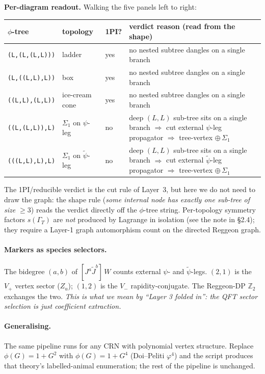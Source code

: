 \documentclass[11pt,a4paper]{article}
\begin{document}
\noindent\textbf{Per-diagram readout.} Walking the five panels left to right:
\begin{center}
\small
\begin{tabular}{@{}lllp{7cm}@{}}
\toprule
$\phi$-tree & topology & 1PI? & verdict reason (read from the shape) \\
\midrule
\texttt{(L,(L,(L,L)))} & ladder         & yes & no nested subtree dangles on a single branch \\
\texttt{(L,((L,L),L))} & box            & yes & no nested subtree dangles on a single branch \\
\texttt{((L,L),(L,L))} & ice-cream cone & yes & no nested subtree dangles on a single branch \\
\texttt{((L,(L,L)),L)} & $\Sigma_1$ on $\psi$-leg       & no  & deep $(L,L)$ sub-tree sits on a single branch $\Rightarrow$ cut external $\psi$-leg propagator $\Rightarrow$ tree-vertex $\oplus\,\Sigma_1$ \\
\texttt{(((L,L),L),L)} & $\Sigma_1$ on $\tilde\psi$-leg & no  & deep $(L,L)$ sub-tree sits on a single branch $\Rightarrow$ cut external $\tilde\psi$-leg propagator $\Rightarrow$ tree-vertex $\oplus\,\Sigma_1$ \\
\bottomrule
\end{tabular}
\end{center}
\noindent The 1PI/reducible verdict is the cut rule of Layer~3, but here we
do not need to draw the graph: the shape rule (\emph{some internal node has
exactly one sub-tree of size $\ge 3$}) reads the verdict directly off the
$\phi$-tree string. Per-topology symmetry factors $s(\Gamma_T)$ are
\emph{not} produced by Lagrange in isolation (see the note in \S2.4); they
require a Layer-1 graph automorphism count on the directed Reggeon graph.

\paragraph{Markers as species selectors.} The bidegree $(a,b)$ of
$[J^a\tilde J^b]\,W$ counts external $\psi$- and $\tilde\psi$-legs. $(2,1)$ is
the $V_+$ vertex sector ($Z_u$); $(1,2)$ is the $V_-$ rapidity-conjugate.
The Reggeon-DP $\mathbb Z_2$ exchanges the two. \emph{This is what we mean by
``Layer 3 folded in'': the QFT sector selection is just coefficient extraction.}

\paragraph{Generalising.} The same pipeline runs for any CRN with polynomial
vertex structure. Replace $\phi(G)=1+G^2$ with $\phi(G)=1+G^4$ (Doi--Peliti
$\varphi^4$) and the script produces that theory's labelled-animal enumeration;
the rest of the pipeline is unchanged.
\end{document}
